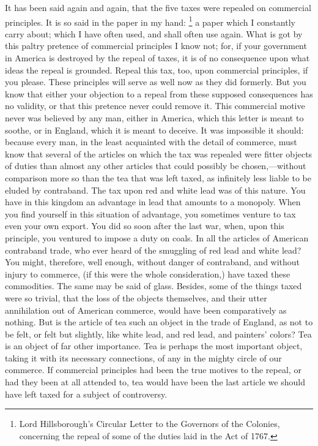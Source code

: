 It has been said again and again, that the five taxes were repealed on commercial principles. It is so said in the paper in my hand:
\footnote{Lord Hillsborough's Circular Letter to the Governors of the Colonies, concerning the repeal of some of the duties laid in the Act of 1767.}
a paper which I constantly carry about; which I have often used, and shall often use again. What is got by this paltry pretence of commercial principles I know not; for, if your government in America is destroyed by the repeal of taxes, it is of no consequence upon what ideas the repeal is grounded. Repeal this tax, too, upon commercial principles, if you please. These principles will serve as well now as they did formerly. But you know that either your objection to a repeal from these supposed consequences has no validity, or that this pretence never could remove it. This commercial motive never was believed by any man, either in America, which this letter is meant to soothe, or in England, which it is meant to deceive. It was impossible it should: because every man, in the least acquainted with the detail of commerce, must know that several of the articles on which the tax was repealed were fitter objects of duties than almost any other articles that could possibly be chosen,—without comparison more so than the tea that was left taxed, as infinitely less liable to be eluded by contraband. The tax upon red and white lead was of this nature. You have in this kingdom an advantage in lead that amounts to a monopoly. When you find yourself in this situation of advantage, you sometimes venture to tax even your own export. You did so soon after the last war, when, upon this principle, you ventured to impose a duty on coals. In all the articles of American contraband trade, who ever heard of the smuggling of red lead and white lead? You might, therefore, well enough, without danger of contraband, and without injury to commerce, (if this were the whole consideration,) have taxed these commodities. The same may be said of glass. Besides, some of the things taxed were so trivial, that the loss of the objects themselves, and their utter annihilation out of American commerce, would have been comparatively as nothing. But is the article of tea such an object in the trade of England, as not to be felt, or felt but slightly, like white lead, and red lead, and painters' colors? Tea is an object of far other importance. Tea is perhaps the most important object, taking it with its necessary connections, of any in the mighty circle of our commerce. If commercial principles had been the true motives to the repeal, or had they been at all attended to, tea would have been the last article we should have left taxed for a subject of controversy.

